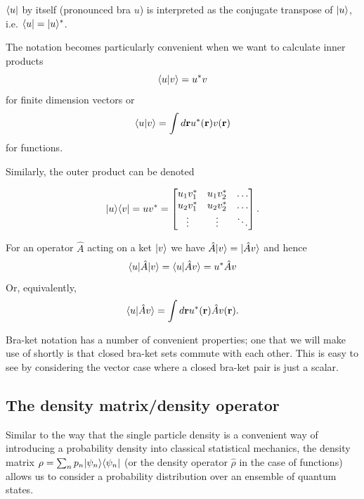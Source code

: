 \documentclass{article}
\begin{document}
$\langle u |$ by itself (pronounced bra $u$) is interpreted as the conjugate transpose of $| u \rangle$, i.e. $\langle u |=| u \rangle^*$.

The notation becomes particularly convenient when we want to calculate inner products
$$
	\langle u | v\rangle = u^*v
$$
for finite dimension vectors or 
$$
	\langle u | v\rangle =	\int d{\bf r}u^*({\bf r})v({\bf r})
$$
for functions.

Similarly, the outer product can be denoted 

$$
| u \rangle\langle v |=uv^* =
\begin{bmatrix}
    u_1v^*_1 & u_1v^*_2  & \dots \\
    u_2v^*_1 & u_2v^*_2  & \dots   \\
    \vdots & \vdots & \ddots 
\end{bmatrix}.
$$

For an operator $\hat{A}$ acting on a ket $| v \rangle$ we have $\hat{A}| v \rangle = | \hat{A}v \rangle$ and hence 
$$
	\langle u |\hat{A}| v \rangle=\langle u | \hat{A}v\rangle = u^*\hat{A}v
$$
Or, equivalently,  
$$
	\langle u | \hat{A}v\rangle = \int d{\bf r} u^*({\bf r}) \hat{A} v({\bf r}).
$$

Bra-ket notation has a number of convenient properties; one that we will make use of shortly is that closed bra-ket sets commute with each other. This is easy to see by considering the vector case where a closed bra-ket pair is just a scalar.

\subsection{The density matrix/density operator}
Similar to the way that the single particle density is a convenient way of introducing a probability density into classical statistical mechanics, the density matrix $\rho = \sum_n p_n| \psi_n \rangle\langle \psi_n |$ (or the density operator $\hat{\rho}$ in the case of functions) allows us to consider a probability distribution over an ensemble of quantum states.
\end{document}
